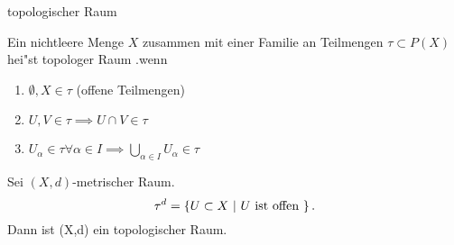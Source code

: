 \documentclass[class=article, crop=false]{standalone}
\begin{document}
\begin{zettel}{topologischer Raum}
\begin{flashcard}
    Ein nichtleere Menge $X$ zusammen mit einer Familie an Teilmengen $\tau \subset P(X)$  hei"st topologer Raum .wenn
    \begin{enumerate}
        \item $\emptyset, X \in  \tau $ (offene Teilmengen)
        \item $U,V \in  \tau  \implies U \cap V \in  \tau $ 
        \item $U_\alpha \in \tau \forall  \alpha \in I \implies \bigcup_{\alpha \in  I} U_{\alpha} \in  \tau  $ 
    \end{enumerate}
\end{flashcard}

\begin{example}
    Sei $ (X,d) $-metrischer Raum.
    \[
        \tau^d = \set{U \subset X}{U \text{ ist offen } }
    .\]
    Dann ist (X,d) ein topologischer Raum.
\end{example}

\end{zettel}
\end{document}
